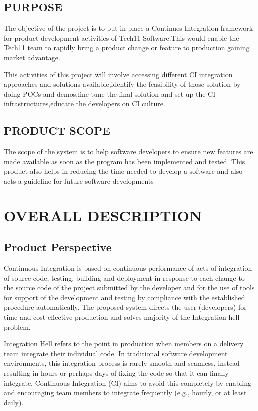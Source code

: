 \documentclass[12pt,a4paper,oneside]{report}
\begin{document}
{\section{PURPOSE}
\par The objective of the project is to put in place a Continues Integration framework for product
development activities of Tech11 Software.This would enable the Tech11 team to rapidly bring a
product change or feature to production gaining market advantage.
\par
This activities of this project will involve accessing different CI integration approaches and
solutions available,identify the feasibility of those solution by doing POCs and demos,fine tune the
final solution and set up the CI infrastructures,educate the developers on CI culture.

\section{PRODUCT SCOPE}
\par  The scope of the system is to help software developers to ensure new features are made available as soon as the program has been
implemented and tested. This product also helps in reducing the time needed to develop a software and also acts a guideline for future software developments
\\

\chapter{OVERALL DESCRIPTION}
\section{Product Perspective}
\par
Continuous Integration is based on continuous performance of acts of integration of
source code, testing, building and deployment in response to each change to the source code of
the project submitted by the developer and for the use of tools for support of the development
and testing by compliance with the established procedure automatically. The proposed system
directs the user (developers) for time and cost effective production and solves majority of the
Integration hell problem. \par
Integration Hell refers to the point in production when members on a delivery team integrate
their individual code. In traditional software development environments, this integration
process is rarely smooth and seamless, instead resulting in hours or perhaps days of fixing the
code so that it can finally integrate. Continuous Integration (CI) aims to avoid this completely
by enabling and encouraging team members to integrate frequently (e.g., hourly, or at least
daily).

}
\end{document}
